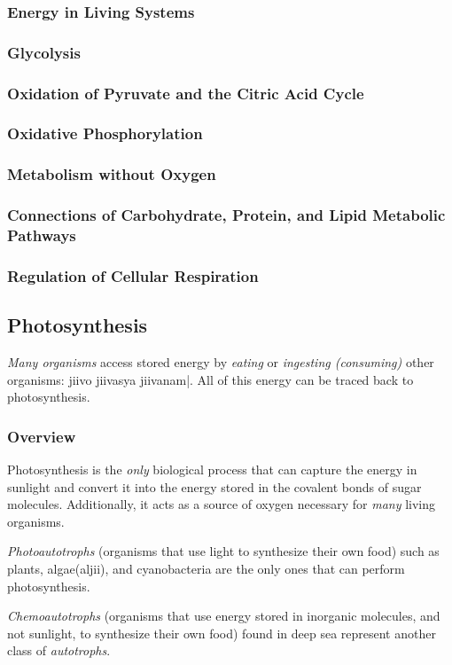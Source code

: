 \documentclass[12pt]{article}
\begin{document}
\subsubsection{Energy in Living Systems}
\subsubsection{Glycolysis}
\subsubsection{Oxidation of Pyruvate and the Citric Acid Cycle}
\subsubsection{Oxidative Phosphorylation}
\subsubsection{Metabolism without Oxygen}
\subsubsection{Connections of Carbohydrate, Protein, and Lipid Metabolic Pathways}
\subsubsection{Regulation of Cellular Respiration}
\subsection{Photosynthesis}
\emph{Many organisms} access stored energy by \emph{eating} or \emph{ingesting (consuming)} other organisms: \textmarathi{jiivo jiivasya jiivanam|}. All of this energy can be traced back to photosynthesis.
\subsubsection{Overview}
Photosynthesis is the \emph{only} biological process that can capture the energy in sunlight and convert it into the energy stored in the covalent bonds of sugar molecules. Additionally, it acts as a source of oxygen necessary for \emph{many} living organisms.

\emph{Photoautotrophs} (organisms that use light to synthesize their own food) such as plants, algae(\textmarathi{\dev aljii}), and cyanobacteria are the only ones that can perform photosynthesis.

\emph{Chemoautotrophs} (organisms that use energy stored in inorganic molecules, and not sunlight, to synthesize their own food) found in deep sea represent another class of \emph{autotrophs}.
\end{document}
